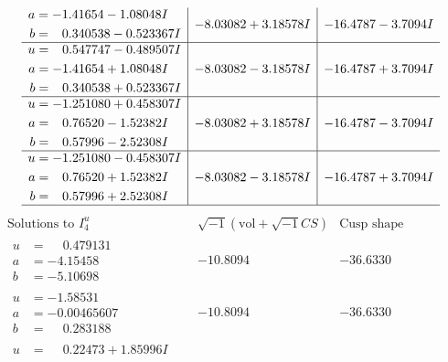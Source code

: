 \documentclass[1p]{elsarticle_modified}
\theoremstyle{definition}
\newcommand{\I}{\sqrt{-1}}
\begin{document}
$$\begin{array}{c|c|c}
\begin{aligned}
a &= -1.41654 - 1.08048 I \\
b &= \phantom{-}0.340538 - 0.523367 I\end{aligned}
 & -8.03082 + 3.18578 I & -16.4787 - 3.7094 I \\ \hline\begin{aligned}
u &= \phantom{-}0.547747 - 0.489507 I \\
a &= -1.41654 + 1.08048 I \\
b &= \phantom{-}0.340538 + 0.523367 I\end{aligned}
 & -8.03082 - 3.18578 I & -16.4787 + 3.7094 I \\ \hline\begin{aligned}
u &= -1.251080 + 0.458307 I \\
a &= \phantom{-}0.76520 - 1.52382 I \\
b &= \phantom{-}0.57996 - 2.52308 I\end{aligned}
 & -8.03082 + 3.18578 I & -16.4787 - 3.7094 I \\ \hline\begin{aligned}
u &= -1.251080 - 0.458307 I \\
a &= \phantom{-}0.76520 + 1.52382 I \\
b &= \phantom{-}0.57996 + 2.52308 I\end{aligned}
 & -8.03082 - 3.18578 I & -16.4787 + 3.7094 I\\
 \hline 
 \end{array}$$\newpage$$\begin{array}{c|c|c}  
\text{Solutions to }I^u_{4}& \I (\text{vol} + \sqrt{-1}CS) & \text{Cusp shape}\\
 \hline 
\begin{aligned}
u &= \phantom{-}0.479131\phantom{ +0.000000I} \\
a &= -4.15458\phantom{ +0.000000I} \\
b &= -5.10698\phantom{ +0.000000I}\end{aligned}
 & -10.8094\phantom{ +0.000000I} & -36.6330\phantom{ +0.000000I} \\ \hline\begin{aligned}
u &= -1.58531\phantom{ +0.000000I} \\
a &= -0.00465607\phantom{ +0.000000I} \\
b &= \phantom{-}0.283188\phantom{ +0.000000I}\end{aligned}
 & -10.8094\phantom{ +0.000000I} & -36.6330\phantom{ +0.000000I} \\ \hline\begin{aligned}
u &= \phantom{-}0.22473 + 1.85996 I \\

\end{aligned}
\end{array}$$
\end{document}
